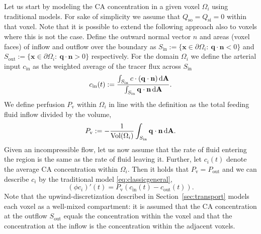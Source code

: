 \documentclass[journal,twocolumn]{IEEEtran}
\newcommand{\Perfv}{P_{\mathrm{v}}}
\newcommand{\vq}{\mathbf{q}}
\newcommand{\vx}{\mathbf{x}}
\begin{document}
	Let us start by modeling the CA concentration in a given voxel $\Omega_i$ using traditional models.
	For sake of simplicity we assume that $Q_{\mathrm{so}} = Q_{\mathrm{si}} = 0$ within that voxel.
	Note that it is possible to extend the following approach also to voxels where this is not the case.
	Define the outward normal vector $n$ and areas (voxel faces) of inflow and outflow over the boundary as $S_{\mathrm{in}} := \{ \vx \in \partial \Omega_i: \ \vq \cdot \mathbf{n} < 0 \}$ and $S_{\mathrm{out}}:= \{ \vx \in \partial \Omega_i: \ \vq \cdot \mathbf{n} > 0 \}$ respectively.
	For the domain $\Omega_i$ we define the arterial input $c_{\mathrm{in}}$ as the weighted average of the tracer flux across $S_{\mathrm{in}}$
	\begin{equation}\label{eq:cin}
	 	c_{\mathrm{in}}(t):= \frac{\int_{S_{\mathrm{in}}}c \cdot (\vq \cdot \mathbf{n}) \diffint \mathbf{A}}{\int_{S_{\mathrm{in}}} \vq \cdot \mathbf{n} \diffint \mathbf{A}}.
	\end{equation}
	We define perfusion $\Perfv$ within $\Omega_i$ in line with the definition as the total feeding fluid inflow divided by the volume,
	\begin{equation}\label{eq:perflocal}
		\Perfv :=-\frac{1}{\mathrm{Vol}( \Omega_i)}\int_{S_{\mathrm{in}}} \vq \cdot \mathbf{n} \diffint \mathbf{A}.
	\end{equation}
	Given an incompressible flow, let us now assume that the rate of fluid entering the region is the same as the rate of fluid leaving it. 
	Further, let $c_i(t)$ denote the average CA concentration within $\Omega_i$.
	Then it holds that $\Perfv=P_{\mathrm{out}}$ and we can describe $c_i$ by the traditional model \eqref{eq:classicgeneral},
	\begin{equation}\label{eq:singlevoxel}
		(\phi c_i)'(t)  = \Perfv (c_\mathrm{in}(t)  - c_\mathrm{out}(t)).
	\end{equation}
	Note that the upwind-discretization described in Section~\ref{sec:transport} models each voxel as a well-mixed compartment: it is assumed that the CA concentration at the outflow $S_\mathrm{out}$ equals the concentration within the voxel and that the concentration at the inflow is the concentration within the adjacent voxels.
\end{document}
